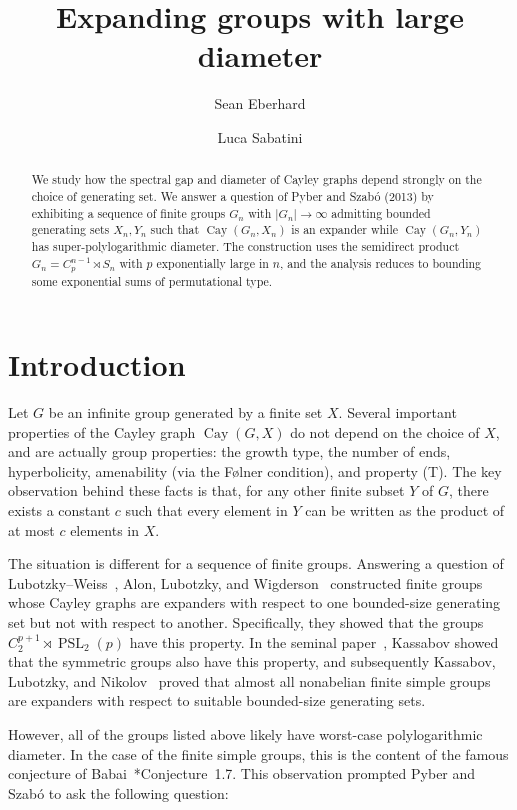 \documentclass[11pt]{amsart}
\author[Sean Eberhard]{Sean Eberhard}
\author[Luca Sabatini]{Luca Sabatini}
\numberwithin{equation}{section}
\theoremstyle{remark}
\newcommand{\op}{\operatorname}
\newcommand{\Cay}{\op{Cay}}
\newcommand{\PSL}{\op{PSL}}
\begin{document}
\title{Expanding groups with large diameter}
\maketitle


\begin{abstract}
    We study how the spectral gap and diameter of Cayley graphs depend strongly on the choice of generating set.
    We answer a question of Pyber and Szab\'o (2013)
    by exhibiting a sequence of finite groups $G_n$ with $|G_n| \to \infty$ admitting bounded generating sets $X_n,Y_n$ such that $\operatorname{Cay}(G_n,X_n)$ is an expander
    while $\operatorname{Cay}(G_n,Y_n)$ has super-polylogarithmic diameter.
    The construction uses the semidirect product $G_n = C_p^{n-1} \rtimes S_n$ with $p$ exponentially large in $n$,
    and the analysis reduces to bounding some exponential sums of permutational type.
\end{abstract}


\vspace{0.5cm}
\section{Introduction}

Let $G$ be an infinite group generated by a finite set $X$.
Several important properties of the Cayley graph $\Cay(G,X)$ do not depend on the choice of $X$,
and are actually group properties:
the growth type, the number of ends, hyperbolicity, amenability (via the F{\o}lner condition), and property (T).
The key observation behind these facts is that, for any other finite subset $Y$ of $G$,
there exists a constant $c$ such that every element in $Y$ can be written as the product of at most $c$ elements in $X$.

The situation is different for a sequence of finite groups.
Answering a question of Lubotzky--Weiss~\cite{LW93}, Alon, Lubotzky, and Wigderson~\cite{ALW01}
constructed finite groups whose Cayley graphs are expanders with respect to one bounded-size generating set but not with respect to another.
Specifically, they showed that the groups $C_2^{p+1} \rtimes \PSL_2(p)$ have this property.
In the seminal paper~\cite{Kas07}, Kassabov showed that the symmetric groups also have this property,
and subsequently Kassabov, Lubotzky, and Nikolov~\cite{KLN06} proved that almost all nonabelian finite simple groups are expanders with respect to suitable bounded-size generating sets.

However, all of the groups listed above likely have worst-case polylogarithmic diameter.
In the case of the finite simple groups, this is the content of the famous conjecture of Babai~\cite{BS92}*{Conjecture~1.7}.
This observation prompted Pyber and Szab\'o to ask the following question:
\end{document}

